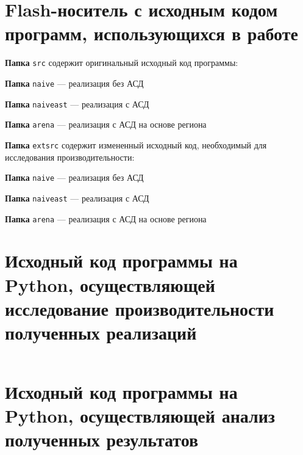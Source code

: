 \documentclass[bachelor, och, otchet]{SCWorks}
\begin{document}
\section{Flash-носитель с исходным кодом программ, использующихся в работе}
\noindent \textbf{Папка} \verb|src| содержит оригинальный исходный код программы:

\textbf{Папка} \verb|naive| — реализация без АСД

\textbf{Папка} \verb|naiveast| — реализация с АСД

\textbf{Папка} \verb|arena| — реализация с АСД на основе региона

\noindent \textbf{Папка} \verb|extsrc| содержит измененный исходный код, необходимый для исследования производительности:

\textbf{Папка} \verb|naive| — реализация без АСД

\textbf{Папка} \verb|naiveast| — реализация с АСД

\textbf{Папка} \verb|arena| — реализация с АСД на основе региона


\section{Исходный код программы на Python, осуществляющей исследование производительности полученных реализаций}

\inputminted{python}{test.py}

\section{Исходный код программы на Python, осуществляющей анализ
полученных результатов}

\inputminted{python}{graph.py}
\end{document}
